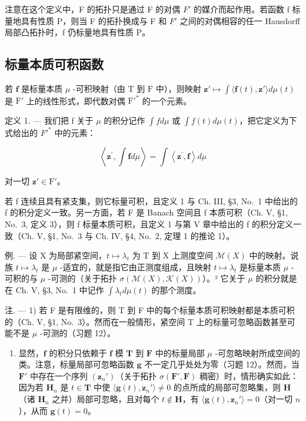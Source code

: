 注意在这个定义中，F 的拓扑只是通过 F 的对偶 \(F'\) 的媒介而起作用。若函数 f 标量地具有性质 P，则当 F 的拓扑换成与 F 和 \(F'\) 之间的对偶相容的任一 Hausdorff 局部凸拓扑时，f 仍标量地具有性质 P。

\subsection{标量本质可积函数}

若 \(\mathbf{f}\) 是标量本质 \(\mu\) -可积映射（由 \(\mathrm{T}\) 到 \(\mathrm{F}\) 中），则映射 \(\mathbf{z}' \mapsto \int \langle \mathbf{f}(t), \mathbf{z}' \rangle d\mu(t)\) 是 \(\mathrm{F}'\) 上的线性形式，即代数对偶 \(\mathrm{F}'^*\) 的一个元素。

定义 1. --- 我们把 f 关于 \(\mu\) 的积分记作 \(\int f d\mu\) 或 \(\int f(t) d\mu(t)\)，把它定义为下式给出的 \(F'^{*}\) 中的元素：

\[
\left\langle \mathbf {z} ^ {\prime}, \int \mathbf {f} d \mu \right\rangle = \int \left\langle \mathbf {z} ^ {\prime}, \mathbf {f} \right\rangle d \mu
\]

对一切 \(\mathbf{z}' \in \mathrm{F}'\)。

若 f 连续且具有紧支集，则它标量可积，且定义 1 与 Ch. III, §3, No.~1 中给出的 f 的积分定义一致。另一方面，若 F 是 Banach 空间且 f 本质可积（Ch. V, §1, No.~3, 定义 3），则 f 标量本质可积，且定义 1 与第 V 章中给出的 f 的积分定义一致（Ch. V, §1, No.~3 与 Ch. IV, §4, No.~2, 定理 1 的推论 1）。

例. --- 设 X 为局部紧空间，\(t \mapsto \lambda_{t}\) 为 T 到 X 上测度空间 \(\mathcal{M}(X)\) 中的映射。说族 \(t \mapsto \lambda_{t}\) 是 \(\mu\) -适宜的，就是指它由正测度组成，且映射 \(t \mapsto \lambda_{t}\) 是标量本质 \(\mu\) -可积的与 \(\mu\) -可测的（关于拓扑 \(\sigma(\mathcal{M}(X), \mathcal{K}(X))\)）。² 它关于 \(\mu\) 的积分就是在 Ch. V, §3, No.~1 中记作 \(\int \lambda_t d\mu(t)\) 的那个测度。

注. --- 1) 若 F 是有限维的，则 T 到 F 中的每个标量本质可积映射都是本质可积的（Ch. V, §1, No.~3）。然而在一般情形，紧空间 T 上的标量可忽略函数甚至可能不是 \(\mu\) -可测的（习题 12）。

\begin{enumerate}
\def\labelenumi{\arabic{enumi})}
\setcounter{enumi}{1}
\tightlist
\item
  显然，\(\mathbf{f}\) 的积分只依赖于 \(\mathbf{f}\) 模 \(\mathbf{T}\) 到 \(\mathbf{F}\) 中的标量局部 \(\mu\) -可忽略映射所成空间的类。注意，标量局部可忽略函数 \(\mathbf{g}\) 不一定几乎处处为零（习题 12）。然而，当 \(\mathbf{F}'\) 中存在一个序列 \((\mathbf{z}_n')\)（关于拓扑 \(\sigma(\mathbf{F}',\mathbf{F})\) 稠密）时，情形确实如此：因为若 \(\mathbf{H}_n\) 是 \(t \in \mathbf{T}\) 中使 \(\langle \mathbf{g}(t), \mathbf{z}_n' \rangle \neq 0\) 的点所成的局部可忽略集，则 \(\mathbf{H}\)（诸 \(\mathbf{H}_n\) 之并）局部可忽略，且对每个 \(t \notin \mathbf{H}\)，有 \(\langle \mathbf{g}(t), \mathbf{z}_n' \rangle = 0\)（对一切 \(n\)），从而 \(\mathbf{g}(t) = 0\)。
\end{enumerate}


